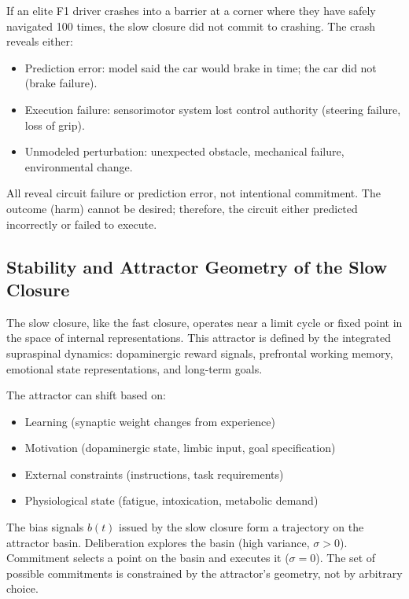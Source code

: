 \begin{remark}
If an elite F1 driver crashes into a barrier at a corner where they have safely navigated 100 times, the slow closure did not commit to crashing. The crash reveals either:
\begin{itemize}
\item Prediction error: model said the car would brake in time; the car did not (brake failure).
\item Execution failure: sensorimotor system lost control authority (steering failure, loss of grip).
\item Unmodeled perturbation: unexpected obstacle, mechanical failure, environmental change.
\end{itemize}

All reveal circuit failure or prediction error, not intentional commitment. The outcome (harm) cannot be desired; therefore, the circuit either predicted incorrectly or failed to execute.
\end{remark}

\subsection{Stability and Attractor Geometry of the Slow Closure}

\begin{definition}
The slow closure, like the fast closure, operates near a limit cycle or fixed point in the space of internal representations. This attractor is defined by the integrated supraspinal dynamics: dopaminergic reward signals, prefrontal working memory, emotional state representations, and long-term goals.

The attractor can shift based on:
\begin{itemize}
\item Learning (synaptic weight changes from experience)
\item Motivation (dopaminergic state, limbic input, goal specification)
\item External constraints (instructions, task requirements)
\item Physiological state (fatigue, intoxication, metabolic demand)
\end{itemize}
\end{definition}

\begin{proposition}
The bias signals $b(t)$ issued by the slow closure form a trajectory on the attractor basin. Deliberation explores the basin (high variance, $\sigma > 0$). Commitment selects a point on the basin and executes it ($\sigma = 0$). The set of possible commitments is constrained by the attractor's geometry, not by arbitrary choice.
\end{proposition}

